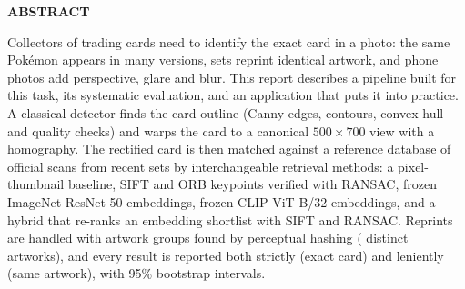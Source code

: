 \begin{center}
    {\fontsize{18pt}{0pt} \MakeUppercase{\textbf{abstract}}}
\vspace*{24pt}
\end{center}

Collectors of trading cards need to identify the exact card in a photo: the same Pok\'emon appears in many versions, sets reprint identical artwork, and phone photos add perspective, glare and blur. This report describes a pipeline built for this task, its systematic evaluation, and an application that puts it into practice. A classical detector finds the card outline (Canny edges, contours, convex hull and quality checks) and warps the card to a canonical $500\times700$ view with a homography. The rectified card is then matched against a reference database of  official scans from  recent sets by interchangeable retrieval methods: a pixel-thumbnail baseline, SIFT and ORB keypoints verified with RANSAC, frozen ImageNet ResNet-50 embeddings, frozen CLIP ViT-B/32 embeddings, and a hybrid that re-ranks an embedding shortlist with SIFT and RANSAC. Reprints are handled with artwork groups found by perceptual hashing ( distinct artworks), and every result is reported both strictly (exact card) and leniently (same artwork), with 95\% bootstrap intervals.

